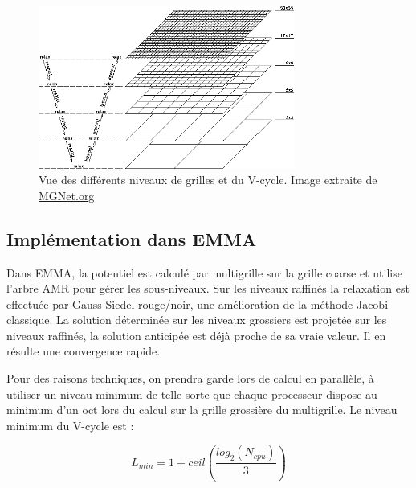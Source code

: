 \begin{figure}
\begin{center}
\includegraphics[width=0.75\textwidth]{img/02/multigrid.png}
\caption[Multigrille]{Vue des différents niveaux de grilles et du V-cycle.
 Image extraite de \href{http://MGNet.org}{MGNet.org} }
\label{fig:mgrid}
\end{center}
\end{figure}	


\subsection{Implémentation dans EMMA}

Dans EMMA, la potentiel est calculé par multigrille sur la grille coarse et utilise l'arbre \ac{AMR} pour gérer les sous-niveaux.
Sur les niveaux raffinés la relaxation est effectuée par Gauss Siedel rouge/noir, une amélioration de la méthode Jacobi classique.
La solution déterminée sur les niveaux grossiers est projetée sur les niveaux raffinés, la solution anticipée est déjà proche de sa vraie valeur. 
Il en résulte une convergence rapide.

Pour des raisons techniques, on prendra garde lors de calcul en parallèle, à utiliser un niveau minimum de telle sorte que chaque processeur dispose au minimum d'un oct lors du calcul sur la grille grossière du multigrille.
Le niveau minimum du V-cycle est : 

\begin{equation}
L_{min} = 1 + ceil \left(\frac{log_2(N_{cpu})}{3}  \right) 
\end{equation}


